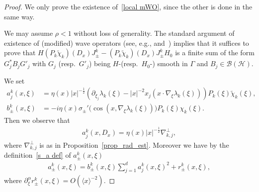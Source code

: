 \documentclass[10pt]{amsart}
\theoremstyle{definition}\newtheorem{defi}[theo]{Definition}\newtheorem{rema}[theo]{Remark}\newtheorem{exam}[theo]{Example}\newtheorem{exem}[theo]{Example}\newtheorem{nota}[theo]{Notation}
\renewcommand{\a}{\alpha}
\renewcommand{\l}{\lambda}
\newcommand{\x}{\xi}
\newcommand{\y}{\eta}
\newcommand{\s}{\sigma}
\newcommand{\HS}{\mathcal{H}}
\newcommand{\BS}{\mathcal{B}}
\newcommand{\jap}[1]{\langle #1 \rangle}
\begin{document}
\begin{proof}
We only prove the existence of~\eqref{local mWO}, since the other is done in the same way.

We may assume $\rho<1$ without loss of generality. The standard argument of existence of (modified) wave operators (see, e.g., \cite[Lemmas~10.2.1 and 10.2.2, Theorem~0.5.4]{Y} and~\cite[Theorem~XIII. 24]{R-S4}) implies that it suffices to prove that $H (P_k \tilde\chi_k)(D_x)J_\pm^k - (P_k \tilde\chi_k)(D_x)J_\pm^k H_0$ is a finite sum of the form $G_j^* B_j G'_j$ with $G_j$ (resp.\ $G'_j$) being $H$-(resp.\ $H_0$-) smooth in $\Gamma$ and $B_j\in\BS(\HS)$.

We set
\begin{align*}
a_j^k(x,\x) &= \y(x)|x|^{-\frac{1}{2}}\left(\partial_{\x_j}\l_k(\x)-|x|^{-2} x_j \left(x\cdot\nabla_\x\l_k(\x)\right)\right) P_k(\x) \tilde\chi_k(\x), \\
b_{\pm}^k(x,\x) &= -i \y(x)\s_\pm'\bigl(\cos(x,\nabla_\x\lambda_k(\x)) \bigr) P_k(\x) \chi_k(\x).
\end{align*}
Then we observe that
\begin{align*}
a_j^k(x,D_x)=\y(x)|x|^{-\frac12}\nabla_{k,j}^\perp,
\end{align*}
where $\nabla_{k,j}^\perp$ is as in Proposition~\ref{prop_rad_est}. Moreover we have by the definition~\eqref{s_a def} of $a_\pm^k(x,\x)$
\begin{align*}
a_\pm^k(x,\x)=b_\pm^k(x,\x) \sum_{j=1}^d a_j^k(x,\x)^2 + r_\pm^k(x,\x),
\end{align*}
where $\partial_\x^\a r_\pm^k(x,\x) = O(\jap{x}^{-2})$.


\end{proof}
\end{document}

